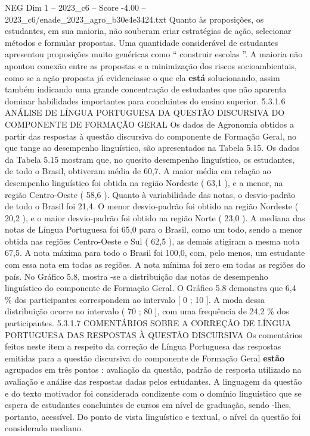 \begin{textsample}{NEG Dim 1 – 2023\_c6 – Score -4.00 – 2023\_c6/enade\_2023\_agro\_b30e4e3424.txt}
Quanto às proposições, os estudantes, em sua maioria, não souberam criar estratégias de ação, selecionar métodos e formular propostas.
Uma quantidade considerável de estudantes apresentou proposições muito genéricas como “ construir escolas ”.
A maioria não apontou conexão entre as propostas e a minimização dos riscos socioambientais, como se a ação proposta já evidenciasse o que ela \textbf{está} solucionando, assim também indicando uma grande concentração de estudantes que não aparenta dominar habilidades importantes para concluintes do ensino superior. 5.3.1.6 ANÁLISE DE LÍNGUA PORTUGUESA DA QUESTÃO DISCURSIVA DO COMPONENTE DE FORMAÇÃO GERAL Os dados de Agronomia obtidos a partir das respostas à questão discursiva do componente de Formação Geral, no que tange ao desempenho linguístico, são apresentados na Tabela 5.15.
Os dados da Tabela 5.15 mostram que, no quesito desempenho linguístico, os estudantes, de todo o Brasil, obtiveram média de 60,7.
A maior média em relação ao desempenho linguístico foi obtida na região Nordeste ( 63,1 ), e a menor, na região Centro-Oeste ( 58,6 ).
Quanto à variabilidade das notas, o desvio-padrão de todo o Brasil foi 21,4.
O menor desvio-padrão foi obtido na região Nordeste ( 20,2 ), e o maior desvio-padrão foi obtido na região Norte ( 23,0 ).
A mediana das notas de Língua Portuguesa foi 65,0 para o Brasil, como um todo, sendo a menor obtida nas regiões Centro-Oeste e Sul ( 62,5 ), as demais atigiram a mesma nota 67,5.
A nota máxima para todo o Brasil foi 100,0, com, pelo menos, um estudante com essa nota em todas as regiões.
A nota mínima foi zero em todas as regiões do país.
No Gráfico 5.8, mostra -se a distribuição das notas de desempenho linguístico do componente de Formação Geral.
O Gráfico 5.8 demonstra que 6,4 \% dos participantes correspondem ao intervalo [ 0 ; 10 ].
A moda dessa distribuição ocorre no intervalo ( 70 ; 80 ], com uma frequência de 24,2 \% dos participantes. 5.3.1.7 COMENTÁRIOS SOBRE A CORREÇÃO DE LÍNGUA PORTUGUESA DAS RESPOSTAS À QUESTÃO DISCURSIVA Os comentários feitos neste item a respeito da correção de Língua Portuguesa das respostas emitidas para a questão discursiva do componente de Formação Geral \textbf{estão} agrupados em três pontos : avaliação da questão, padrão de resposta utilizado na avaliação e análise das respostas dadas pelos estudantes.
A linguagem da questão e do texto motivador foi considerada condizente com o domínio linguístico que se espera de estudantes concluintes de cursos em nível de graduação, sendo -lhes, portanto, acessível.
Do ponto de vista linguístico e textual, o nível da questão foi considerado mediano.

\end{textsample}
